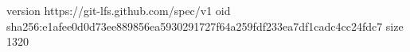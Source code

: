version https://git-lfs.github.com/spec/v1
oid sha256:e1afee0d0d73ee889856ea5930291727f64a259fdf233ea7df1cadc4cc24fdc7
size 1320
